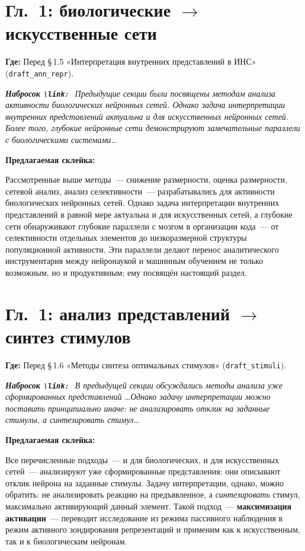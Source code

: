 \documentclass[12pt,a4paper]{article}
\newenvironment{sketch}{%
  \begin{mdframed}[backgroundcolor=black!4, linecolor=black!25, linewidth=0.4pt,
    innertopmargin=5pt, innerbottommargin=5pt]\small\itshape
  \textbf{\upshape Набросок \texttt{\textbackslash link}:}\ }{%
  \end{mdframed}}
\newenvironment{glue}{%
  \begin{mdframed}[backgroundcolor=green!5, linecolor=green!40!black, linewidth=0.6pt,
    innertopmargin=5pt, innerbottommargin=5pt]
  \textbf{Предлагаемая склейка:}\par\smallskip}{%
  \end{mdframed}}
\newcommand{\loc}[1]{\par\noindent\textcolor{blue!55!black}{\textbf{Где:} #1}\par}
\begin{document}
\section{Гл.~1: биологические $\to$ искусственные сети}
\loc{Перед \S\,1.5 «Интерпретация внутренних представлений в ИНС» (\texttt{draft\_ann\_repr}).}
\begin{sketch}
Предыдущие секции были посвящены методам анализа активности биологических
нейронных сетей. Однако задача интерпретации внутренних представлений актуальна
и для искусственных нейронных сетей. Более того, глубокие нейронные сети
демонстрируют замечательные параллели с биологическими системами\ldots
\end{sketch}
\begin{glue}
Рассмотренные выше методы~--- снижение размерности, оценка размерности, сетевой
анализ, анализ селективности~--- разрабатывались для активности биологических
нейронных сетей. Однако задача интерпретации внутренних представлений в равной
мере актуальна и для искусственных сетей, а глубокие сети обнаруживают глубокие
параллели с мозгом в организации кода~--- от селективности отдельных элементов
до низкоразмерной структуры популяционной активности. Эти параллели делают
перенос аналитического инструментария между нейронаукой и машинным обучением не
только возможным, но и продуктивным; ему посвящён настоящий раздел.
\end{glue}

\section{Гл.~1: анализ представлений $\to$ синтез стимулов}
\loc{Перед \S\,1.6 «Методы синтеза оптимальных стимулов» (\texttt{draft\_stimuli}).}
\begin{sketch}
В предыдущей секции обсуждались методы анализа уже сформированных представлений
\ldots Однако задачу интерпретации можно поставить принципиально иначе: не
анализировать отклик на заданные стимулы, а \textit{синтезировать} стимул\ldots
\end{sketch}
\begin{glue}
Все перечисленные подходы~--- и для биологических, и для искусственных сетей~---
анализируют уже сформированные представления: они описывают отклик нейрона на
заданные стимулы. Задачу интерпретации, однако, можно обратить: не анализировать
реакцию на предъявленное, а \textit{синтезировать} стимул, максимально
активирующий данный элемент. Такой подход~--- \textbf{максимизация активации}~---
переводит исследование из режима пассивного наблюдения в режим активного
зондирования репрезентаций и применим как к искусственным, так и к биологическим
нейронам.
\end{glue}
\end{document}
